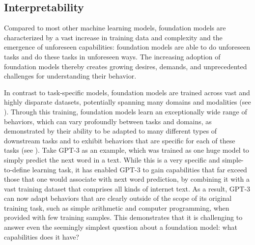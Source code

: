 \newsection
\subsection{Interpretability}
\label{sec:interpretability}

Compared to most other machine learning models, foundation models are characterized by a vast increase in training data and complexity and the emergence of unforeseen capabilities: foundation models are able to do unforeseen tasks and do these tasks in unforeseen ways.
The increasing adoption of foundation models thereby creates growing desires, demands, and unprecedented challenges for understanding their behavior.

In contrast to task-specific models, foundation models are trained across vast and highly disparate datasets, potentially spanning many domains and modalities (see ).
Through this training, foundation models learn an exceptionally wide range of behaviors, which can vary profoundly between tasks and domains, as demonstrated by their ability to be adapted to many different types of downstream tasks and to exhibit behaviors that are specific for each of these tasks (see ).
Take GPT-3 as an example, which was trained as one huge model to simply predict the next word in a text.
While this is a very specific and simple-to-define learning task, it has enabled GPT-3 to gain capabilities that far exceed those that one would associate with next word prediction, by combining it with a vast training dataset that comprises all kinds of internet text.
As a result, GPT-3 can now adapt behaviors that are clearly outside of the scope of its original training task, such as simple arithmetic and computer programming, when provided with few training samples.
This demonstrates that it is challenging to answer even the seemingly simplest question about a foundation model: what capabilities does it have?

